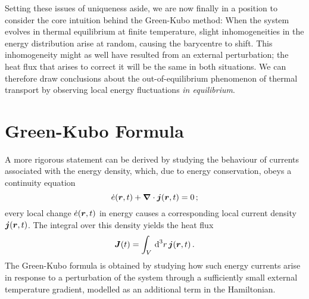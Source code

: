 \clearpage
{}
Setting these issues of uniqueness aside, we are now finally in a position to consider the core intuition behind the Green-Kubo method:
When the system evolves in thermal equilibrium at finite temperature, slight inhomogeneities in the energy distribution arise at random, causing the barycentre to shift. This inhomogeneity might as well have resulted from an external perturbation; the heat flux that arises to correct it will be the same in both situations. We can therefore draw conclusions about the out-of-equilibrium phenomenon of thermal transport by observing local energy fluctuations \emph{in equilibrium}.

\section{Green-Kubo Formula}



A more rigorous statement can be derived by studying the behaviour of currents associated with the energy density, which, due to energy conservation, obeys a continuity equation
\begin{equation}
    \dot e(\R, t) + \boldsymbol{\nabla} \cdot \boldsymbol{j}(\R, t) = 0 \, ; \label{eq:gk-ceqn}
\end{equation}
every local change $\dot {e}(\boldsymbol{r}, t)$ in energy causes a corresponding local current density $\boldsymbol{j}(\boldsymbol{r}, t)$.
The integral over this density yields the heat flux
\begin{equation}
    \J(t) = \integral{V}^3r \, \densj(\R, t) \, . \label{eq:gk-Jasint}
\end{equation}
The Green-Kubo formula is obtained by studying how such energy currents arise in response to a perturbation of the system through a sufficiently small external temperature gradient, modelled as an additional term in  the Hamiltonian.

